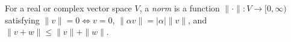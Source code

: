 
For a real or complex vector space $V$, a \emph{norm} is a function $\|\cdot\|:V\to[0,\infty)$ satisfying $\|v\|=0\iff v=0$, $\|\alpha v\|=|\alpha|\|v\|$, and $\|v+w\|\le\|v\|+\|w\|$.
